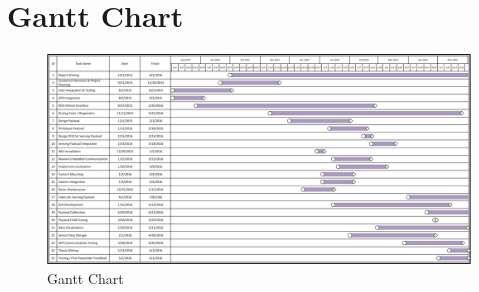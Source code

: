 \appendixpagenumbering
\chapter{Gantt Chart} \label{App:Gantt}

\begin{figure}[H]
\centerline{\includegraphics[angle=90,width=0.64\linewidth]{images/GanttChart2016.png}}
\caption[]{Gantt Chart}
\label{fig:Gantt}
\end{figure}
	